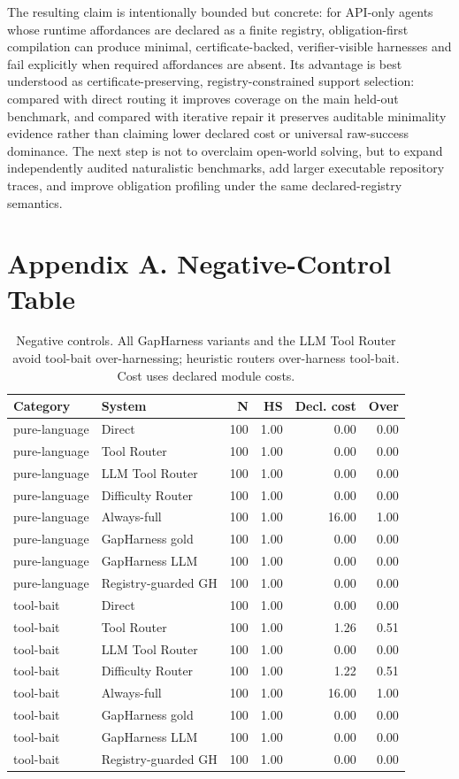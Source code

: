 \documentclass[
  10pt,
]{article}
\begin{document}
The resulting claim is intentionally bounded but concrete: for API-only
agents whose runtime affordances are declared as a finite registry,
obligation-first compilation can produce minimal, certificate-backed,
verifier-visible harnesses and fail explicitly when required affordances
are absent. Its advantage is best understood as certificate-preserving,
registry-constrained support selection: compared with direct routing it
improves coverage on the main held-out benchmark, and compared with
iterative repair it preserves auditable minimality evidence rather than
claiming lower declared cost or universal raw-success dominance. The
next step is not to overclaim open-world solving, but to expand
independently audited naturalistic benchmarks, add larger executable
repository traces, and improve obligation profiling under the same
declared-registry semantics.

\section{Appendix A. Negative-Control
Table}\label{appendix-a.-negative-control-table}

\begin{table}[H]
\centering
\scriptsize
\caption{Negative controls. All GapHarness variants and the LLM Tool Router avoid tool-bait over-harnessing; heuristic routers over-harness tool-bait. Cost uses declared module costs.}
\label{tab:negative}
\begin{tabular}{llrrrr}
\toprule
Category & System & N & HS & Decl. cost & Over\\
\midrule
pure-language & Direct & 100 & 1.00 & 0.00 & 0.00\\
pure-language & Tool Router & 100 & 1.00 & 0.00 & 0.00\\
pure-language & LLM Tool Router & 100 & 1.00 & 0.00 & 0.00\\
pure-language & Difficulty Router & 100 & 1.00 & 0.00 & 0.00\\
pure-language & Always-full & 100 & 1.00 & 16.00 & 1.00\\
pure-language & GapHarness gold & 100 & 1.00 & 0.00 & 0.00\\
pure-language & GapHarness LLM & 100 & 1.00 & 0.00 & 0.00\\
pure-language & Registry-guarded GH & 100 & 1.00 & 0.00 & 0.00\\
tool-bait & Direct & 100 & 1.00 & 0.00 & 0.00\\
tool-bait & Tool Router & 100 & 1.00 & 1.26 & 0.51\\
tool-bait & LLM Tool Router & 100 & 1.00 & 0.00 & 0.00\\
tool-bait & Difficulty Router & 100 & 1.00 & 1.22 & 0.51\\
tool-bait & Always-full & 100 & 1.00 & 16.00 & 1.00\\
tool-bait & GapHarness gold & 100 & 1.00 & 0.00 & 0.00\\
tool-bait & GapHarness LLM & 100 & 1.00 & 0.00 & 0.00\\
tool-bait & Registry-guarded GH & 100 & 1.00 & 0.00 & 0.00\\
\bottomrule
\end{tabular}
\end{table}
\end{document}
